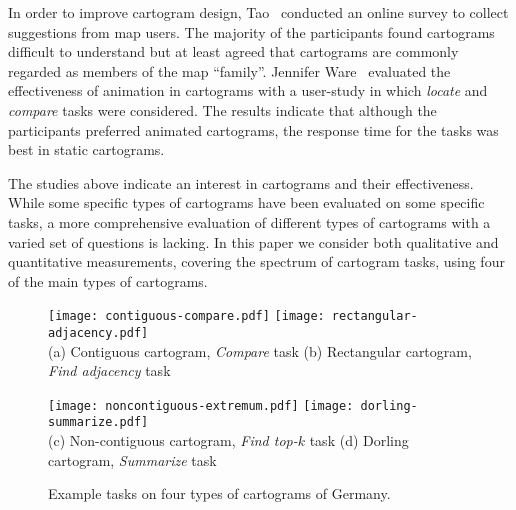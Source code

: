 \documentclass[10pt,journal,compsoc]{IEEEtran}
\begin{document}
In order to improve cartogram design, Tao~\cite{Manting} conducted an online survey to collect suggestions from map users. 
The majority of the participants found cartograms difficult to understand 
but at least agreed that 
 cartograms are commonly regarded as members of the map ``family''. 
  Jennifer Ware~\cite{Jen} evaluated the effectiveness of animation in cartograms with a user-study in which \textit{locate} and \textit{compare} tasks were considered. The results indicate that although the participants preferred animated cartograms, the response time for the tasks was best in static cartograms. 

The studies above indicate an interest in cartograms and their effectiveness. While some specific types of cartograms have been evaluated on some specific tasks, a more comprehensive evaluation of different types of cartograms with a varied set of questions is lacking. In this paper we consider both qualitative and quantitative measurements, covering the spectrum of cartogram tasks, using four of the main types of cartograms.



\begin{figure*}[t!]
\centering
\hfill
\texttt{[image: contiguous-compare.pdf]}
\hfill
\texttt{[image: rectangular-adjacency.pdf]}
\hfill
\\

(a) Contiguous cartogram, \textit{Compare} task \hspace{0.2\textwidth}(b) Rectangular cartogram, \textit{Find adjacency} task\\

\medskip

\hfill
\texttt{[image: noncontiguous-extremum.pdf]}
\hfill
\texttt{[image: dorling-summarize.pdf]}
\hfill
\\

\hspace{-0.08\textwidth}
(c) Non-contiguous cartogram, \textit{Find top-$k$} task \hspace{0.15\textwidth}(d) Dorling cartogram, \textit{Summarize} task\\

\caption{Example tasks on four types of cartograms of Germany.}

\label{fig:four-types}
\end{figure*}
\end{document}
